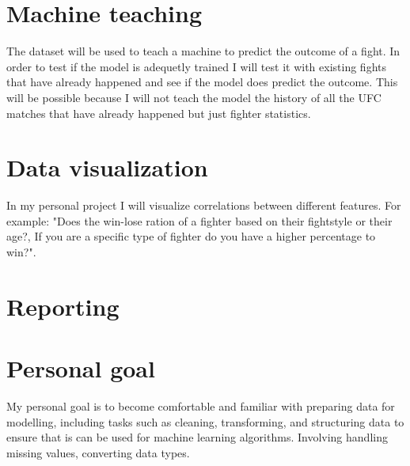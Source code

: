 \documentclass{article}
\begin{document}
\section{Machine teaching}
The dataset will be used to teach a machine to predict the outcome of a fight. In order to test if the model 
is adequetly trained I will test it with existing fights that have already happened and see if the model does predict the outcome. This
will be possible because I will not teach the model the history of all the UFC matches that have already happened but just fighter statistics.

\section{Data visualization}
In my personal project I will visualize correlations between different features. For example: "Does the win-lose ration of a fighter based 
on their fightstyle or their age?, If you are a specific type of fighter do you have a higher percentage to win?".

\section{Reporting}


\section{Personal goal}
My personal goal is to become comfortable and familiar with preparing data for modelling, including tasks such as cleaning, transforming,
and structuring data to ensure that is can be used for machine learning algorithms. Involving handling missing values, converting data types.
\end{document}
